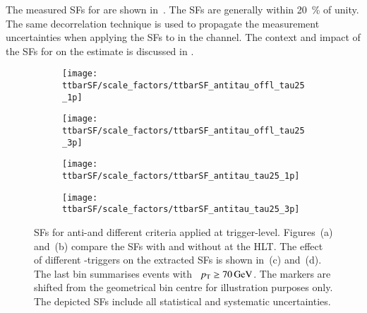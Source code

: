 The measured SFs for \antitau are shown in~. The SFs
are generally within \SI{20}{\percent} of unity. The same decorrelation
technique is used to propagate the measurement uncertainties when applying the
SFs to \antitau in the \hadhad channel. The context and impact of the SFs for
\antitau on the \multijet estimate is discussed in .

\begin{figure}[htbp]
  \centering

  \begin{subfigure}[t]{.495\textwidth}
    \texttt{[image: ttbarSF/scale\_factors/ttbarSF\_antitau\_offl\_tau25\_1p]}
    \subcaption{}
    \label{fig:ttbarSF_antiid_SF_a}
  \end{subfigure}\hfill%
  \begin{subfigure}[t]{.495\textwidth}
    \texttt{[image: ttbarSF/scale\_factors/ttbarSF\_antitau\_offl\_tau25\_3p]}
    \subcaption{}
    \label{fig:ttbarSF_antiid_SF_b}
  \end{subfigure}

  \begin{subfigure}[t]{.495\textwidth}
    \texttt{[image: ttbarSF/scale\_factors/ttbarSF\_antitau\_tau25\_1p]}
    \subcaption{}
    \label{fig:ttbarSF_antiid_SF_c}
  \end{subfigure}\hfill%
  \begin{subfigure}[t]{.495\textwidth}
    \texttt{[image: ttbarSF/scale\_factors/ttbarSF\_antitau\_tau25\_3p]}
    \subcaption{}
    \label{fig:ttbarSF_antiid_SF_d}
  \end{subfigure}

  \caption[\Faketauhadvis SFs for anti-\tauhadvis and different \tauid criteria
  applied at trigger-level.]{\Faketauhadvis SFs for anti-\tauhadvis and
    different \tauid criteria applied at trigger-level. Figures~(a) and~(b)
    compare the SFs with and without \tauid at the HLT. The effect of different
    \tauhadvis-triggers on the extracted SFs is shown in~(c) and~(d). The last
    bin summarises events with \tauhadvis~$\pT \geq \SI{70}{\GeV}$. The markers
    are shifted from the geometrical bin centre for illustration purposes
    only. The depicted SFs include all statistical and systematic
    uncertainties.}%
  \label{fig:ttbarSF_antiid_SF}
\end{figure}

